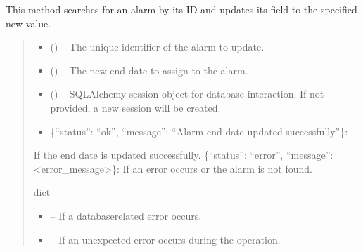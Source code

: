 \documentclass[letterpaper,10pt,english]{sphinxmanual}
\begin{document}
\begin{fulllineitems}
\begin{fulllineitems}
\sphinxAtStartPar
This method searches for an alarm by its ID and updates its  field
to the specified new value.
\begin{quote}\begin{description}
\begin{itemize}
\item {} 
\sphinxAtStartPar
{} () – The unique identifier of the alarm to update.

\item {} 
\sphinxAtStartPar
{} () – The new end date to assign to the alarm.

\item {} 
\sphinxAtStartPar
{} (\sphinxstyleliteralemphasis{\sphinxupquote{, }}) – SQLAlchemy session object for database interaction.
If not provided, a new session will be created.

\end{itemize}

\sphinxAtStartPar
\begin{description}
\begin{itemize}
\item {} 
\sphinxAtStartPar
\{“status”: “ok”, “message”: “Alarm end date updated successfully”\}:

\end{itemize}

\sphinxAtStartPar
If the end date is updated successfully.
\sphinxhyphen{} \{“status”: “error”, “message”: <error\_message>\}:
If an error occurs or the alarm is not found.

\end{description}


\sphinxAtStartPar
dict

\begin{itemize}
\item {} 
\sphinxAtStartPar
{} – If a database\sphinxhyphen{}related error occurs.

\item {} 
\sphinxAtStartPar
{} – If an unexpected error occurs during the operation.

\end{itemize}

\end{description}\end{quote}

\end{fulllineitems}


\end{fulllineitems}
\end{document}
